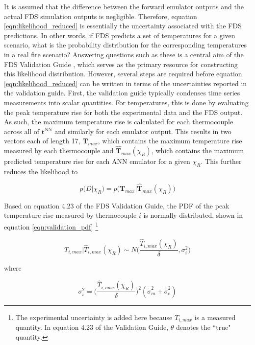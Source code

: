 \documentclass{article}
\begin{document}
It is assumed that the difference between the forward emulator outputs and the actual FDS simulation outputs is negligible. Therefore, equation \ref{eqn:likelihood_reduced} is essentially the uncertainty associated with the FDS predictions. In other words, if FDS predicts a set of temperatures for a given scenario, what is the probability distribution for the corresponding temperatures in a real fire scenario? Answering questions such as these is a central aim of the FDS Validation Guide \cite{mcgrattan2020fire}, which serves as the primary resource for constructing this likelihood distribution. However, several steps are required before equation \ref{eqn:likelihood_reduced} can be written in terms of the uncertainties reported in the validation guide. First, the validation guide typically condenses time series measurements into scalar quantities. For temperatures, this is done by evaluating the peak temperature rise for both the experimental data and the FDS output. As such, the maximum temperature rise is calculated for each thermocouple across all of $\boldsymbol{t}^\text{NN}$ and similarly for each emulator output. This results in two vectors each of length 17, $\boldsymbol{T}_{max}$, which contains the maximum temperature rise measured by each thermocouple and $\boldsymbol{\hat{T}}_{max}(\chi_R)$, which contains the maximum predicted temperature rise for each ANN emulator for a given $\chi_R$. This further reduces the likelihood to 

 \begin{equation}
  \label{eqn:likelihood_vector}
  p\big(D\big|\chi_R\big) = p\bigg(\boldsymbol{T}_{max} \bigg| \boldsymbol{\hat{T}}_{max}(\chi_R)\bigg)
\end{equation}

Based on equation 4.23  of the FDS Validation Guide, the PDF of the peak temperature rise measured by thermocouple $i$ is normally distributed, shown in equation \ref{eqn:validation_pdf} \footnote{The experimental uncertainty is added here because $T_{i,max}$ is a measured quantity. In equation 4.23 of the Validation Guide, $\theta$ denotes the ``true" quantity.} 

 \begin{equation}
  \label{eqn:validation_pdf}
  T_{i,max} \big| \hat{T}_{i,max}(\chi_R) \sim N\Bigg( \frac{\hat{T}_{i,max}(\chi_R)}{\delta} ,   \sigma_i^2 \Bigg)
\end{equation}

\noindent where 

$$
\sigma_i^2 = \bigg( \frac{\hat{T}_{i,max}(\chi_R)}{\delta} \bigg)^2(\tilde{\sigma}_m^2 + \tilde{\sigma}_e^2)
$$
\end{document}
